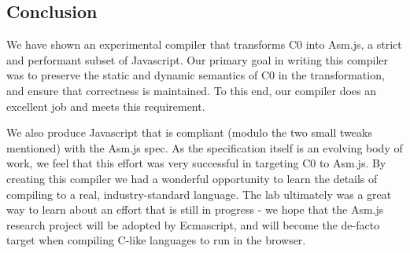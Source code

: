 \documentclass[twoside]{article}
\begin{document}
\begin{multicols}{2}

\section{Conclusion}

We have shown an experimental compiler that transforms C0 into Asm.js, a strict
and performant subset of Javascript. Our primary goal in writing this compiler
was to preserve the static and dynamic semantics of C0 in the transformation, and
ensure that correctness is maintained. To this end, our compiler does an excellent
job and meets this requirement. 

We also produce Javascript that is compliant (modulo the two small tweaks mentioned) 
with the Asm.js spec. As the specification itself is an evolving body of work, we 
feel that this effort was very successful in targeting C0 to Asm.js. By creating this
compiler we had a wonderful opportunity to learn the details of compiling to 
a real, industry-standard language. The lab ultimately was a great way to learn about
an effort that is still in progress - we hope that the Asm.js research project will
be adopted by Ecmascript, and will become the de-facto target when compiling C-like
languages to run in the browser. 
\end{multicols}
\end{document}
